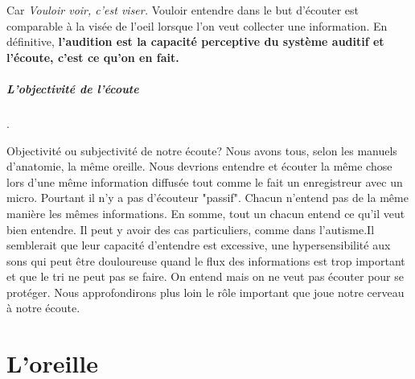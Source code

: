 Car \emph{Vouloir voir, c'est viser.}  Vouloir entendre dans le but d'écouter est comparable  à
la visée de l'oeil lorsque l'on veut collecter une information.  
En définitive,\textbf{ l'audition est la capacité perceptive du système auditif et l'écoute, c'est ce qu'on en fait.}

\subparagraph{L'objectivité de l'écoute}.

Objectivité ou subjectivité de notre écoute?  Nous avons tous,
selon les manuels d'anatomie, la même
oreille. Nous devrions entendre et écouter la même chose
lors d'une même information diffusée tout comme le fait un enregistreur avec un micro. Pourtant il n'y a pas d'écouteur "passif". Chacun n'entend pas de la même manière les mêmes
informations. En somme, tout un chacun entend ce qu'il veut bien
entendre. 
Il peut y avoir des cas particuliers, comme dans l'autisme.Il semblerait que leur capacité d'entendre est excessive, une hypersensibilité aux sons qui peut être douloureuse quand  le flux des informations est trop important et que le tri ne peut pas se faire. On entend mais on ne veut pas écouter pour se protéger.
Nous approfondirons plus loin le rôle important que joue notre cerveau à notre
écoute.
\section{L'oreille}
